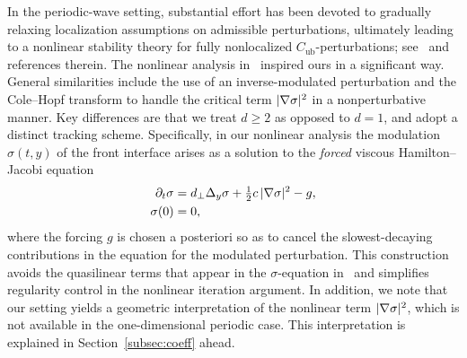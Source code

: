 \documentclass[12pt,oneside,a4paper,reqno]{amsart}
\numberwithin{equation}{section}
\theoremstyle{definition}
\theoremstyle{remark}
\newcommand{\Cub}{{C_{\mathrm{ub}}}}
\DeclarePairedDelimiter{\abs}{\lvert}{\rvert}
\begin{document}
In the periodic-wave setting, substantial effort has been devoted to gradually relaxing localization assumptions on admissible perturbations, ultimately leading to a nonlinear stability theory for fully nonlocalized $\Cub$-perturbations; see~\cite{derijk_nonlinear_2024} and references therein. The nonlinear analysis in~\cite{derijk_nonlinear_2024} inspired ours in a significant way. General similarities include the use of an inverse-modulated perturbation and the Cole--Hopf transform to handle the critical term $\abs{\nabla \sigma}^2$ in a nonperturbative manner.
Key differences are that we treat $d \geq 2$ as opposed to $d = 1$, and adopt a distinct tracking scheme. Specifically, in our nonlinear analysis the modulation $\sigma(t,y)$ of the front interface arises as a solution to the \emph{forced} viscous Hamilton--Jacobi equation
\begin{align}
\label{eq:pdesigma}
\begin{split}
\partial_t\sigma &= d_{\bot}\Delta_y \sigma + \tfrac{1}{2}c \, \abs{\nabla \sigma}^2 - g,\\
\sigma(0) &= 0,
\end{split}
\end{align}
where the forcing $g$ is chosen a posteriori so as to cancel the slowest-decaying contributions in the equation for the modulated perturbation. 
This construction avoids the quasilinear terms that appear in the $\sigma$-equation in~\cite{derijk_nonlinear_2024} and simplifies regularity control in the nonlinear iteration argument.
In addition, we note that our setting yields a geometric interpretation of the nonlinear term $\abs{\nabla \sigma}^2$, which is not available in the one-dimensional periodic case.
This interpretation is explained in Section~\ref{subsec:coeff} ahead.
\end{document}
